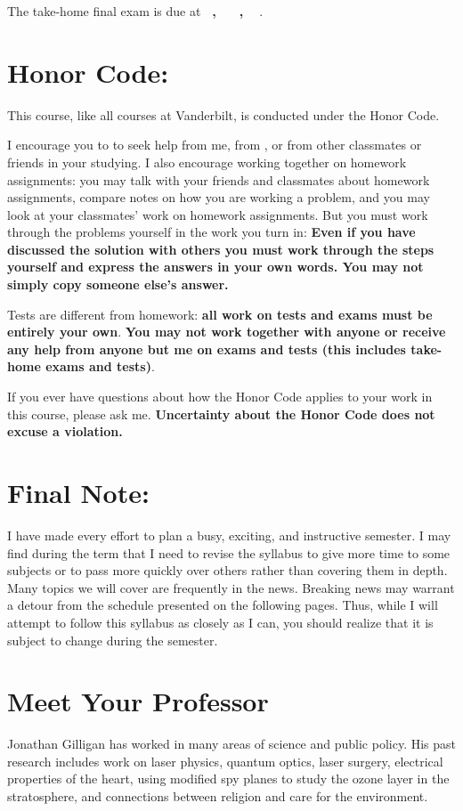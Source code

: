 \documentclass[11pt]{jgsyllabus}\usepackage[]{graphicx}\usepackage[]{xcolor}
\begin{document}
The take-home final exam is due at
\ifAltFinal
\textbf{\AltFinalExamEndTime~\AltFinalExamDay, \AltFinalExamMonth~\AltFinalExamDate}%
\else
\textbf{\FinalExamEndTime~\FinalExamDay, \FinalExamMonth~\FinalExamDate}%
\fi
.

\section{Honor Code:}
This course, like all courses at Vanderbilt, is conducted under the Honor Code.

I encourage you to to seek help from me, from \TaTitle,
or from other classmates or friends in your studying. I also encourage working together
on homework assignments: you may talk with your friends and classmates about
homework assignments, compare notes on how you are working a problem, and you
may look at your classmates' work on homework assignments. %
But you must work through the problems yourself
in the work you turn in: \textbf{Even if you have discussed the solution with others you must
work through the steps yourself and express the answers in your own words. You may not
simply copy someone else's answer.} %

Tests are different from homework: \textbf{%
all work on tests and exams must be entirely your own}.
\textbf{You may not work together with anyone or receive any help from anyone but me
on exams and tests (this includes take-home exams and tests)}.

If you ever
have questions about how the Honor Code applies to your work
in this course, please ask me.
\textbf{Uncertainty about the Honor Code does not excuse a violation.}

\section{Final Note:}

I have made every effort to plan a busy, exciting, and instructive semester.
I may find during the term that I need to revise the syllabus to give more time
to some subjects or to pass more quickly over others rather than covering them
in depth. Many topics we will cover are frequently in the news. Breaking news
may warrant a detour from the schedule presented on the following pages.
Thus, while I will attempt to follow this syllabus as closely as I can,
you should realize that it is subject to change during the semester.
%
%
\iftrue
\section{Meet Your Professor}
Jonathan Gilligan has worked in many areas of science and public policy.
His past research includes work on laser physics, quantum optics,
laser surgery, electrical properties of the heart, using modified spy planes to
study the ozone layer in the stratosphere, and connections between religion and
care for the environment.
\iffalse
\end{document}
